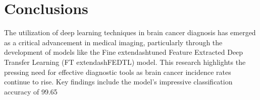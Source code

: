 \documentclass[runningheads]{llncs}
\begin{document}
\section{Conclusions}
The utilization of deep learning techniques in brain cancer diagnosis has emerged as a critical advancement in medical imaging, particularly through the development of models like the Fine	extendash{}tuned Feature Extracted Deep Transfer Learning (FT	extendash{}FEDTL) model. This research highlights the pressing need for effective diagnostic tools as brain cancer incidence rates continue to rise. Key findings include the model's impressive classification accuracy of 99.65%
\end{document}
